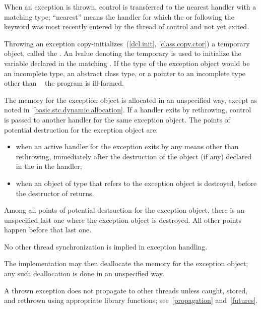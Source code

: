 \pnum
{}%
%
%
When an exception is thrown, control is transferred to the nearest handler with
a matching type; ``nearest'' means the handler
for which the
 or
following the
keyword was most recently entered by the thread of control and not yet exited.

\pnum
Throwing an exception
copy-initializes~(\ref{dcl.init}, \ref{class.copy.ctor}) a temporary object,
called the
.
An lvalue denoting the temporary is used to initialize the
variable declared in the matching
.
If the type of the exception object would be
an incomplete type,
an abstract class type,
or a pointer to an incomplete type other than \cv{}~
the program is ill-formed.

\pnum
{}%
%
%
The memory for the exception object is
allocated in an unspecified way, except as noted in~\ref{basic.stc.dynamic.allocation}.
If a handler exits by rethrowing, control is passed to another handler for
the same exception object.
The points of potential destruction for the exception object are:
\begin{itemize}
\item
when an active handler for the exception exits by
any means other than
rethrowing,
immediately after the destruction of the object (if any)
declared in the  in the handler;

\item
when an object of type 
that refers to the exception object is destroyed,
before the destructor of  returns.
\end{itemize}

Among all points of potential destruction for the exception object,
there is an unspecified last one
where the exception object is destroyed.
All other points happen before that last one.
\begin{note}
No other thread synchronization is implied in exception handling.
\end{note}
The implementation may then
deallocate the memory for the exception object; any such deallocation
is done in an unspecified way.
\begin{note}
A thrown exception does not
propagate to other threads unless caught, stored, and rethrown using
appropriate library functions; see~\ref{propagation} and~\ref{futures}.
\end{note}

